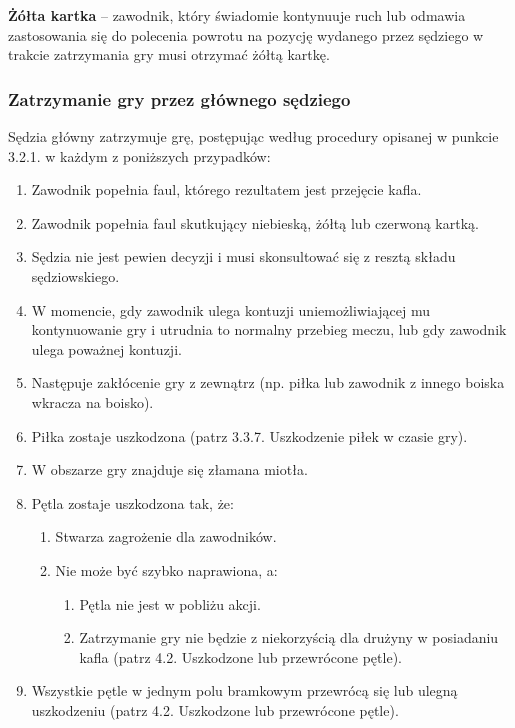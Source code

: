 \documentclass[12pt]{article}
\newcommand\yellowcard[1]{\bgroup\textcolor{darkyellow}{\textbf{#1}}}
\begin{document}
\yellowcard{Żółta kartka} -- zawodnik, który świadomie kontynuuje ruch lub
odmawia zastosowania się do polecenia powrotu na pozycję wydanego przez
sędziego w trakcie zatrzymania gry musi otrzymać żółtą kartkę.

\subsubsection{Zatrzymanie gry przez głównego sędziego}

Sędzia główny zatrzymuje grę, postępując według procedury opisanej w
punkcie 3.2.1. w każdym z poniższych przypadków:

\begin{enumerate}
	\item Zawodnik popełnia faul, którego rezultatem jest przejęcie kafla.

	\item Zawodnik popełnia faul skutkujący niebieską, żółtą lub czerwoną
	      kartką.

	\item Sędzia nie jest pewien decyzji i musi skonsultować się z resztą
	      składu sędziowskiego.

	\item W momencie, gdy zawodnik ulega kontuzji uniemożliwiającej mu
	      kontynuowanie gry i utrudnia to normalny przebieg meczu, lub gdy
	      zawodnik ulega poważnej kontuzji.

	\item Następuje zakłócenie gry z zewnątrz (np. piłka lub zawodnik z innego
	      boiska wkracza na boisko).

	\item Piłka zostaje uszkodzona (patrz 3.3.7. Uszkodzenie piłek w czasie
	      gry).

	\item W obszarze gry znajduje się złamana miotła.

	\item Pętla zostaje uszkodzona tak, że:
	      \begin{enumerate}
		      \item Stwarza zagrożenie dla zawodników.

		      \item Nie może być szybko naprawiona, a:

		            \begin{enumerate}
			            \item
			                  Pętla nie jest w pobliżu akcji.
			            \item
			                  Zatrzymanie gry nie będzie z niekorzyścią dla drużyny w posiadaniu
			                  kafla (patrz 4.2. Uszkodzone lub przewrócone pętle).
		            \end{enumerate}
	      \end{enumerate}
	\item Wszystkie pętle w jednym polu bramkowym przewrócą się lub ulegną
	      uszkodzeniu (patrz 4.2. Uszkodzone lub przewrócone pętle).


\end{enumerate}
\end{document}
